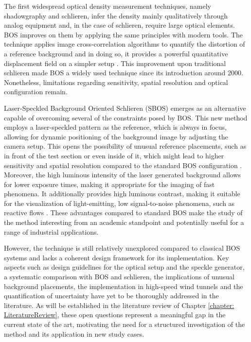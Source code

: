 \par The first widespread optical density measurement techniques, namely shadowgraphy and schlieren, infer the density mainly qualitatively through analog equipment and, in the case of schlieren, require large optical elements. BOS improves on them by applying the same principles with modern tools. The technique applies image cross-correlation algorithms to quantify the distortion of a reference background and in doing so, it provides a powerful quantitative displacement field on a simpler setup \cite{Settles2001, Schmidt2025}. This improvement upon traditional schlieren made BOS a widely used technique since its introduction around 2000. Nonetheless, limitations regarding sensitivity, spatial resolution and optical configuration remain.

\par Laser-Speckled Background Oriented Schlieren (SBOS) emerges as an alternative capable of overcoming several of the constraints posed by BOS. This new method employs a laser-speckled pattern as the reference, which is always in focus, allowing for dynamic positioning of the background image by adjusting the camera setup. This opens the possibility of unusual reference placements, such as in front of the test section or even inside of it, which might lead to higher sensitivity and spatial resolution compared to the standard BOS configuration \cite{Meier&Roesgen2013}. Moreover, the high luminous intensity of the laser generated background allows for lower exposure times, making it appropriate for the imaging of fast phenomena. It additionally provides high luminous contrast, making it suitable for the visualization of light-emitting, low signal-to-noise phenomena, such as reactive flows \cite{Michalski2018, Nakamura2021}. These advantages compared to standard BOS make the study of the method interesting from an academic standpoint and potentially useful for a range of industrial applications.

\par However, the technique is still relatively unexplored compared to classical BOS systems and lacks a coherent design framework for its implementation. Key aspects such as design guidelines for the optical setup and the speckle generator, a systematic comparison with BOS and schlieren, the implications of unusual background placements, the implementation in high-speed wind tunnels and the quantification of uncertainty have yet to be thoroughly addressed in the literature. As will be established in the literature review of Chapter \ref{chapter: LiteratureReview}, these open questions represent a meaningful gap in the current state of the art, motivating the need for a structured investigation of the method and its application in new study cases.

